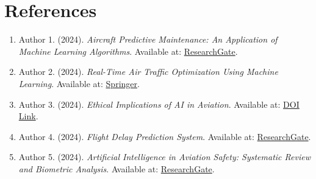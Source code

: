 \documentclass[12pt,a4paper]{article}
\begin{document}
\section*{References}
\begin{enumerate}
    \item Author 1. (2024). \textit{Aircraft Predictive Maintenance: An Application of Machine Learning Algorithms}. Available at: \href{https://www.researchgate.net/publication/381924182_AIRCRAFT_PREDICTIVE_MAINTENANCE_AN_APPLICATION_OF_MACHINE_LEARNING_ALGORITHMS_VERSHA_INTERIM_REPORT_JULY_2024_2}{ResearchGate}.
    \item Author 2. (2024). \textit{Real-Time Air Traffic Optimization Using Machine Learning}. Available at: \href{https://rdcu.be/d6ctv}{Springer}.
    \item Author 3. (2024). \textit{Ethical Implications of AI in Aviation}. Available at: \href{https://doi.org/10.1016/j.dsm.2024.11.001}{DOI Link}.
    \item Author 4. (2024). \textit{Flight Delay Prediction System}. Available at: \href{https://www.researchgate.net/publication/341872407_Flight_Delay_Prediction_System}{ResearchGate}.
    \item Author 5. (2024). \textit{Artificial Intelligence in Aviation Safety: Systematic Review and Biometric Analysis}. Available at: \href{https://www.researchgate.net/publication/385742899_Artificial_Intelligence_in_Aviation_Safety_Systematic_Review_and_Biometric_Analysis}{ResearchGate}.
\end{enumerate}
\end{document}
